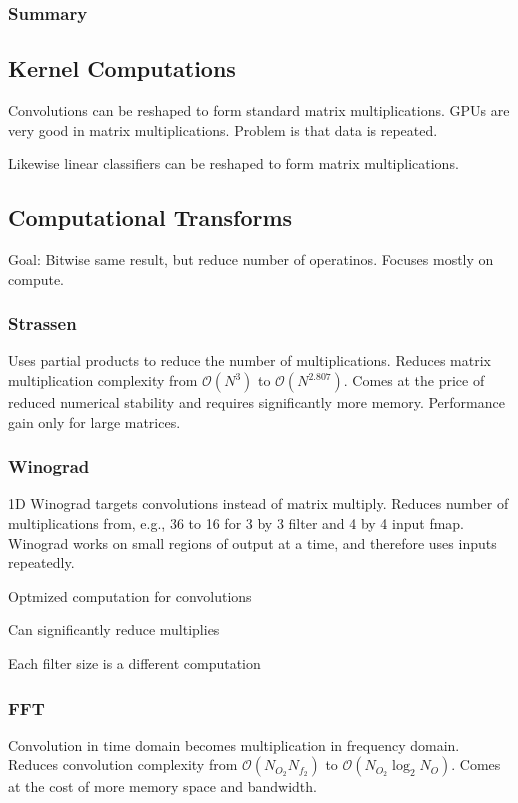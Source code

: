 \documentclass[a4paper, fontsize=8pt, landscape, DIV=1]{scrartcl}
\makeatletter
\renewenvironment{outline}[1][]{%
  \ifthenelse{\equal{#1}{}}{}{\renewcommand{\ol@type}{#1}}%
  \ol@z%
  \newcommand{\0}{\ol@toz\ol@z}%
  \newcommand{\1}{\vspace{\dimexpr\outlinespacingscalar\baselineskip-\baselineskip}\ol@toi\ol@i\item}%
  \newcommand{\2}{\vspace{\dimexpr\outlinespacingscalartwo\baselineskip-\baselineskip}\ol@toii\ol@ii\item}%
  \newcommand{\3}{\vspace{\dimexpr\outlinespacingscalar\baselineskip-\baselineskip}\ol@toiii\ol@iii\item}%
  \newcommand{\4}{\vspace{\dimexpr\outlinespacingscalar\baselineskip-\baselineskip}\ol@toiiii\ol@iiii\item}%
}{%
  \ol@toz\ol@exit%
}
\def\outlinespacingscalar{0.5}
\def\outlinespacingscalartwo{0.5}
\makeatother
\begin{document}
\begin{multicols*}{4}
  \subsubsection{Summary}

  \subsection{Kernel Computations}
  Convolutions can be reshaped to form standard matrix multiplications. GPUs are 
  very good in matrix multiplications. Problem is that data is repeated.

  Likewise linear classifiers can be reshaped to form matrix multiplications.

  \subsection{Computational Transforms}
  Goal: Bitwise same result, but reduce number of operatinos. Focuses
  mostly on compute.

  \subsubsection{Strassen}
  Uses partial products to reduce the number of multiplications. Reduces matrix 
  multiplication complexity from $\mathcal{O}(N^3)$ to $\mathcal{O}(N^{2.807})$. Comes at the
  price of reduced numerical stability and requires significantly more memory. 
  Performance gain only for large matrices.

  \subsubsection{Winograd}
  1D Winograd targets convolutions instead of matrix multiply. Reduces number of multiplications
  from, e.g., 36 to 16 for 3 by 3 filter and 4 by 4 input fmap. Winograd works on small regions
  of output at a time, and therefore uses inputs repeatedly.
  \begin{outline}
    \1 Optmized computation for convolutions
    \1 Can significantly reduce multiplies
    \1 Each filter size is a different computation
  \end{outline}

  \subsubsection{FFT}
  Convolution in time domain becomes multiplication in frequency domain. Reduces convolution
  complexity from $\mathcal{O}(N_{O_2}N_{f_2})$ to $\mathcal{O}(N_{O_2}\log_2N_{O})$. Comes
  at the cost of more memory space and bandwidth.


\end{multicols*}
\end{document}
